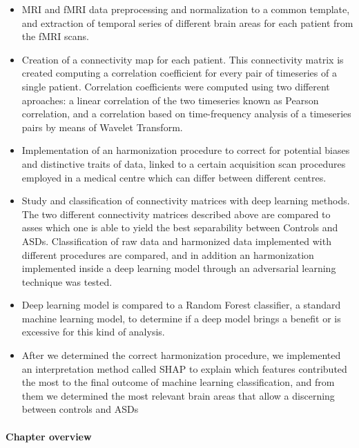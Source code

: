 \documentclass[11pt]{report}
\begin{document}
\begin{itemize}
\item MRI and fMRI data preprocessing and normalization to a common template, and extraction of temporal series of different brain areas for each patient from the fMRI scans.
\item Creation of a connectivity map for each patient. This connectivity matrix is created computing a correlation coefficient for every pair of timeseries of a single patient. Correlation coefficients were computed using two different aproaches: a linear correlation of the two timeseries known as Pearson correlation, and a correlation based on time-frequency analysis of a timeseries pairs by means of Wavelet Transform.
\item Implementation of an harmonization procedure to correct for potential biases and distinctive traits of data, linked to a certain acquisition scan procedures employed in a medical centre which can differ between different centres.
\item Study and classification of connectivity matrices with deep learning methods. The two different connectivity matrices described above are compared to asses which one is able to yield the best separability between Controls and ASDs.
Classification of raw data and harmonized data implemented with different procedures are compared, and in addition an harmonization implemented inside a deep learning model through an adversarial learning technique was tested.
\item Deep learning model is compared to a Random Forest classifier, a standard machine learning model, to determine if a deep model brings a benefit or is excessive for this kind of analysis.
\item After we determined the correct harmonization procedure, we implemented an interpretation method called SHAP to explain which features contributed the most to the final outcome of machine learning classification, and from them we determined the most relevant brain areas that allow a discerning between controls and ASDs
\end{itemize}

\paragraph{Chapter overview} \hfill
\end{document}
